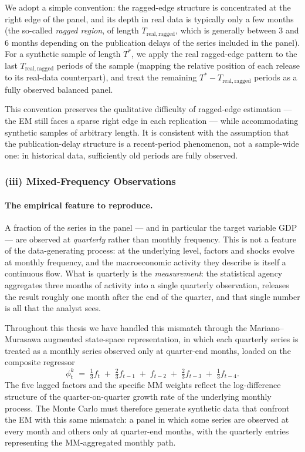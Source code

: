 \documentclass[11pt, a4paper, oneside]{article}
\begin{document}
We adopt a simple convention: the ragged-edge structure is
concentrated at the right edge of the panel, and its depth in
real data is typically only a few months (the so-called
\emph{ragged region}, of length $T_{\mathrm{real, ragged}}$,
which is generally between $3$ and $6$ months depending on the
publication delays of the series included in the panel). For a
synthetic sample of length $T^*$, we apply the real ragged-edge
pattern to the last $T_{\mathrm{real, ragged}}$ periods of the
sample (mapping the relative position of each release to its
real-data counterpart), and treat the remaining $T^* - T_{\mathrm{real, ragged}}$
periods as a fully observed balanced panel.

This convention preserves the qualitative difficulty of
ragged-edge estimation — the EM still faces a sparse right edge
in each replication — while accommodating synthetic samples of
arbitrary length. It is consistent with the assumption that the
publication-delay structure is a recent-period phenomenon, not a
sample-wide one: in historical data, sufficiently old periods are
fully observed.

\subsubsection*{(iii) Mixed-Frequency Observations}
\label{subsubsec:sim-mixed-frequency}

\paragraph{The empirical feature to reproduce.}
A fraction of the series in the panel — and in particular the
target variable GDP — are observed at \emph{quarterly} rather than
monthly frequency. This is not a feature of the data-generating
process: at the underlying level, factors and shocks evolve at
monthly frequency, and the macroeconomic activity they describe
is itself a continuous flow. What is quarterly is the
\emph{measurement}: the statistical agency aggregates three months
of activity into a single quarterly observation, releases the
result roughly one month after the end of the quarter, and that
single number is all that the analyst sees.

Throughout this thesis we have handled this mismatch through the
Mariano--Murasawa augmented state-space representation, in which
each quarterly series is treated as a monthly series observed only
at quarter-end months, loaded on the composite regressor
\[
\phi^k_t \;=\; \tfrac{1}{3} f_t \;+\; \tfrac{2}{3} f_{t-1} \;+\; f_{t-2} \;+\; \tfrac{2}{3} f_{t-3} \;+\; \tfrac{1}{3} f_{t-4}.
\]
The five lagged factors and the specific MM weights reflect the
log-difference structure of the quarter-on-quarter growth rate of
the underlying monthly process. The Monte Carlo must therefore
generate synthetic data that confront the EM with this same
mismatch: a panel in which some series are observed at every
month and others only at quarter-end months, with the
quarterly entries representing the MM-aggregated monthly path.
\end{document}
